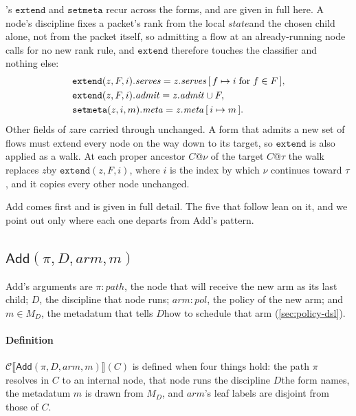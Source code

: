 \documentclass[sigplan,anonymous,review,nonacm]{acmart}
\newcommand{\csem}[1]{\mathcal{C}\llbracket #1 \rrbracket}
\newcommand{\notation}[1]{\ensuremath{#1}\ifmmode\else\xspace\fi}
\newcommand{\zz}{\notation{\mathit{z}}}
\newcommand{\stt}{\notation{\mathit{state}}}
\newcommand{\arm}{\notation{\mathit{arm}}}
\newcommand{\disc}{\notation{D}}
\newcommand{\Add}{\textsf{Add}}
\begin{document}
's \(\mathtt{extend}\) and \(\mathtt{setmeta}\) recur across the forms, and are given in full here.
A node's discipline fixes a packet's rank from the local \stt and the chosen child alone, not from the packet itself, so admitting a flow at an already-running node calls for no new rank rule, and \(\mathtt{extend}\) therefore touches the classifier and nothing else:
\[
\begin{array}{@{}l@{}}
\mathtt{extend}(\mathit{z}, F, i).\mathit{serves} = \mathit{z}.\mathit{serves}\,[\,f \mapsto i \;\text{for}\; f \in F\,],\\[3pt]
\mathtt{extend}(\mathit{z}, F, i).\mathit{admit} = \mathit{z}.\mathit{admit} \cup F,\\[3pt]
\mathtt{setmeta}(\mathit{z}, i, m).\mathit{meta} = \mathit{z}.\mathit{meta}\,[\,i \mapsto m\,].
\end{array}
\]
Other fields of \zz are carried through unchanged.
A form that admits a new set of flows must extend every node on the way down to its target, so \(\mathtt{extend}\) is also applied as a walk.
At each proper ancestor \(C@\nu\) of the target \(C@\tau\) the walk replaces \zz by \(\mathtt{extend}(\mathit{z}, F, i)\), where \(i\) is the index by which \(\nu\) continues toward \(\tau\), and it copies every other node unchanged.

\Add{} comes first and is given in full detail.
The five that follow lean on it, and we point out only where each one departs from \Add's pattern.

\subsection{\texorpdfstring{\(\Add(\pi, D, \mathit{arm}, m)\)}{Add}}\label{sec:add}


\Add{}'s arguments are \(\pi : \mathit{path}\), the node that will receive the new arm as its last child; \(D\), the discipline that node runs; \(\mathit{arm} : \mathit{pol}\), the policy of the new arm; and \(m \in M_{D}\), the metadatum that tells \disc how to schedule that arm (\cref{sec:policy-dsl}).

\paragraph{Definition}

\(\csem{\Add(\pi, D, \mathit{arm}, m)}(C)\) is defined when four things hold: the path \(\pi\) resolves in \(C\) to an internal node, that node runs the discipline \disc the form names, the metadatum \(m\) is drawn from \(M_{D}\), and \arm's leaf labels are disjoint from those of \(C\).
\end{document}
